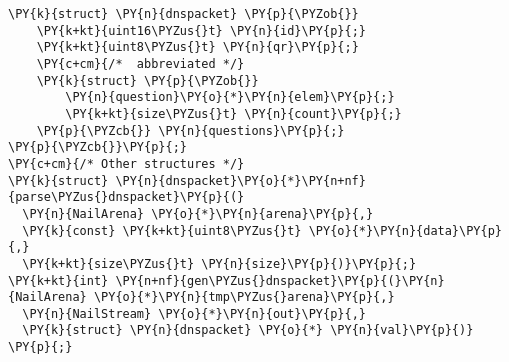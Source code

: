 \begin{Verbatim}[commandchars=\\\{\},codes={\catcode`\$=3\catcode`\^=7\catcode`\_=8}]
\PY{k}{struct} \PY{n}{dnspacket} \PY{p}{\PYZob{}}
    \PY{k+kt}{uint16\PYZus{}t} \PY{n}{id}\PY{p}{;}
    \PY{k+kt}{uint8\PYZus{}t} \PY{n}{qr}\PY{p}{;}
    \PY{c+cm}{/*  abbreviated */}
    \PY{k}{struct} \PY{p}{\PYZob{}}
        \PY{n}{question}\PY{o}{*}\PY{n}{elem}\PY{p}{;}
        \PY{k+kt}{size\PYZus{}t} \PY{n}{count}\PY{p}{;}
    \PY{p}{\PYZcb{}} \PY{n}{questions}\PY{p}{;}
\PY{p}{\PYZcb{}}\PY{p}{;} 
\PY{c+cm}{/* Other structures */}
\PY{k}{struct} \PY{n}{dnspacket}\PY{o}{*}\PY{n+nf}{parse\PYZus{}dnspacket}\PY{p}{(}
  \PY{n}{NailArena} \PY{o}{*}\PY{n}{arena}\PY{p}{,} 
  \PY{k}{const} \PY{k+kt}{uint8\PYZus{}t} \PY{o}{*}\PY{n}{data}\PY{p}{,} 
  \PY{k+kt}{size\PYZus{}t} \PY{n}{size}\PY{p}{)}\PY{p}{;}
\PY{k+kt}{int} \PY{n+nf}{gen\PYZus{}dnspacket}\PY{p}{(}\PY{n}{NailArena} \PY{o}{*}\PY{n}{tmp\PYZus{}arena}\PY{p}{,}
  \PY{n}{NailStream} \PY{o}{*}\PY{n}{out}\PY{p}{,}
  \PY{k}{struct} \PY{n}{dnspacket} \PY{o}{*} \PY{n}{val}\PY{p}{)} \PY{p}{;}
\end{Verbatim}
